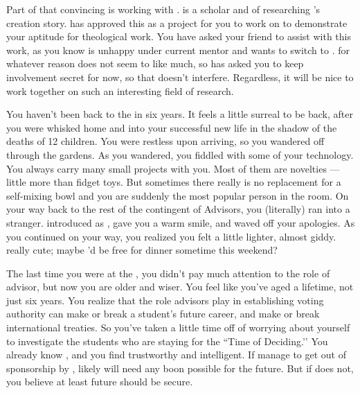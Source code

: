 \documentclass[char]{GL2020}
\begin{document}
Part of that convincing is working with \cEbbPriest{\full}. \cEbbPriest{} is a scholar and \pShippie{} \cEbbPriest{\cleric} of \cEbb{} researching \pEarth{}'s creation story. \cBeetle{} has approved this as a project for you to work on to demonstrate your aptitude for theological work. You have asked your friend \cScholarship{} to assist with this work, as you know \cScholarship{} is unhappy under \cScholarship{\their} current mentor \cAntiChup{} and wants to switch to \cBeetle{}. \cBeetle{} for whatever reason does not seem to like \cScholarship{} much, so \cScholarship{} has asked you to keep \cScholarship{\their} involvement secret for now, so that \cBeetle{} doesn’t interfere. Regardless, it will be nice to work together on such an interesting field of research.

You haven't been back to the \pSc{} in six years. It feels a little surreal to be back, after you were whisked home and into your successful new life in the shadow of the deaths of 12 children. You were restless upon arriving, so you wandered off through the gardens. As you wandered, you fiddled with some of your technology. You always carry many small projects with you. Most of them are novelties — little more than fidget toys. But sometimes there really is no replacement for a self-mixing bowl and you are suddenly the most popular person in the room. On your way back to the rest of the \pTech{} contingent of Advisors, you (literally) ran into a stranger. \cChupAvenger{\They} introduced \cChupAvenger{\themself} as \cChupAvenger{\full}, gave you a warm smile, and waved off your apologies. As you continued on your way, you realized you felt a little lighter, almost giddy. \cChupAvenger{\Theyare} really cute; maybe \cChupAvenger{\they}'d be free for dinner sometime this weekend?

The last time you were at the \pSchool{}, you didn't pay much attention to the role of advisor, but now you are older and wiser. You feel like you’ve aged a lifetime, not just six years. You realize that the role advisors play in establishing voting authority can make or break a student's future career, and make or break international treaties. So you've taken a little time off of worrying about yourself to investigate the \pTech{} students who are staying for the ``Time of Deciding.’’ You already know \cScholarship{}, and you find \cScholarship{\them} trustworthy and intelligent. If \cScholarship{\theydo} manage to get out of sponsorship by \cAntiChup{}, \cScholarship{} likely will need any boon possible for the future. But if \cScholarship{} does not, you believe at least \cScholarship{\their} future should be secure.
\end{document}
